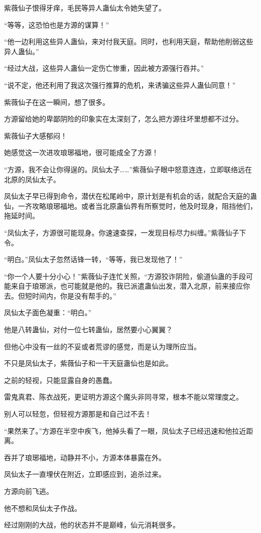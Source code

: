 \begin{this_body}
紫薇仙子恨得牙痒，毛民等异人蛊仙太令她失望了。

“等等，这恐怕也是方源的谋算！”

“他一边利用这些异人蛊仙，来对付我天庭。同时，也利用天庭，帮助他削弱这些异人蛊仙。”

“经过大战，这些异人蛊仙一定伤亡惨重，因此被方源强行吞并。”

“说不定，他还利用了我这次强行推算的危机，来诱骗这些异人蛊仙同意！”

紫薇仙子在这一瞬间，想了很多。

方源留给她的卑鄙阴险的印象实在太深刻了，怎么把方源往坏里想都不过分。

紫薇仙子大感郁闷！

她感觉这一次进攻琅琊福地，很可能成全了方源！

“方源，我不会让你得逞的。凤仙太子……”紫薇仙子眼中怒意连连，立即联络远在北原的凤仙太子。

凤仙太子早已得到命令，潜伏在松尾岭中，原计划是有机会的话，就配合天庭的蛊仙，一齐攻略琅琊福地。或者当北原蛊仙界有所察觉时，他及时现身，阻挡他们，拖延时间。

“凤仙太子，方源很可能现身。你速速查探，一发现目标尽力纠缠。”紫薇仙子下令。

“明白。”凤仙太子忽然话锋一转，“等等，我已发现他了！”

“你一个人要十分小心！”紫薇仙子连忙关照，“方源狡诈阴险，偷道仙蛊的手段可能来自于琅琊派，也可能就是他的。我已派遣蛊仙出发，潜入北原，前来接应你去。但短时间内，你是没有帮手的。”

凤仙太子面色凝重：“明白。”

他是八转蛊仙，对付一位七转蛊仙，居然要小心翼翼？

但他心中没有一丝的不妥或者荒谬的感觉，而是认为理所应当。

不只是凤仙太子，紫薇仙子和一干天庭蛊仙也是如此。

之前的轻视，只能显露自身的愚蠢。

雷鬼真君、陈衣战死，更证明方源这个魔头非同寻常，根本不能以常理度之。

别人可以轻忽，但轻视方源那是和自己过不去！

“果然来了。”方源在半空中疾飞，他掉头看了一眼，凤仙太子已经迅速和他拉近距离。

吞并了琅琊福地，动静并不小，方源本体暴露在外。

凤仙太子一直埋伏在附近，立即感应到，追杀过来。

方源向前飞逃。

他不想和凤仙太子作战。

经过刚刚的大战，他的状态并不是巅峰，仙元消耗很多。


\end{this_body}
